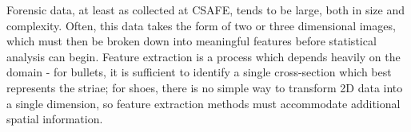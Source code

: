 \documentclass[12pt, letterpaper, sans]{moderncv}
\begin{document}
Forensic data, at least as collected at CSAFE, tends to be large, both in size and complexity. Often, this data takes the form of two or three dimensional images, which must then be broken down into meaningful features before statistical analysis can begin. Feature extraction is a process which depends heavily on the domain - for bullets, it is sufficient to identify a single cross-section which best represents the striae; for shoes, there is no simple way to transform 2D data into a single dimension, so feature extraction methods must accommodate additional spatial information. 
% 
% 
\end{document}
